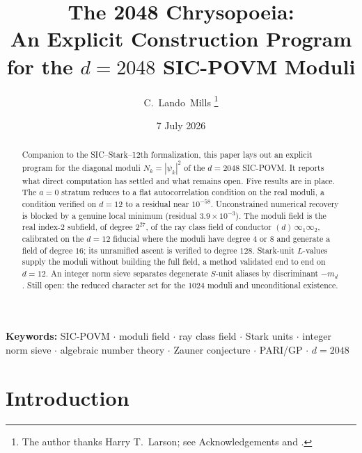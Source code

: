 \documentclass[12pt,a4paper]{article}
\newcommand{\md}{m_d}
\begin{document}
\title{\textbf{The 2048 Chrysopoeia:\\
An Explicit Construction Program for the $d=2048$ SIC-POVM Moduli}}

\author{C.\ Lando\ Mills%
\thanks{The author thanks Harry T.\ Larson; see Acknowledgements and \cite{Larson1961}.}}

\date{7 July 2026}

\maketitle

\begin{abstract}
Companion to the SIC--Stark--12th formalization, this paper lays out an explicit program for the
diagonal moduli $N_k=|\psi_k|^2$ of the $d=2048$ SIC-POVM.  It reports what direct
computation has settled and what remains open.  Five results are in place.  The
$a=0$ stratum reduces to a flat autocorrelation condition on the real moduli, a
condition verified on $d=12$ to a residual near $10^{-58}$.  Unconstrained
numerical recovery is blocked by a genuine local minimum (residual
$3.9\times 10^{-3}$).  The moduli field is the real index-$2$ subfield, of
degree $2^{27}$, of the ray class field of conductor $(d)\,\infty_1\infty_2$,
calibrated on the $d=12$ fiducial where the moduli have degree $4$ or $8$ and
generate a field of degree $16$; its unramified ascent is verified to degree
$128$.  Stark-unit $L$-values
supply the moduli without building the full field, a method validated end to end
on $d=12$.  An integer norm sieve separates degenerate $S$-unit aliases by
discriminant $-\md$.  Still open: the reduced character set for the $1024$
moduli and unconditional existence.
\end{abstract}

\noindent\textbf{Keywords:} SIC-POVM \(\cdot\) moduli field \(\cdot\) ray class
field \(\cdot\) Stark units \(\cdot\) integer norm sieve \(\cdot\) algebraic
number theory \(\cdot\) Zauner conjecture \(\cdot\) PARI/GP \(\cdot\) $d=2048$

\newpage
\tableofcontents
\newpage

\section{Introduction}
\label{sec:intro}
\end{document}
